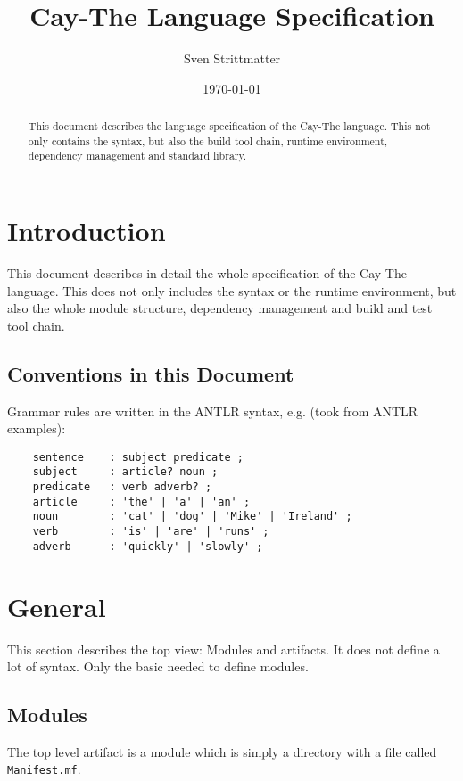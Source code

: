 \documentclass[a4paper,12pt]{report}
\title{Cay-The Language Specification}
\author{Sven Strittmatter}
\date{\today}
\begin{document}
\maketitle
\begin{abstract}
    This document describes the language specification of the Cay-The language. This not only contains the syntax, but also the build tool chain, runtime environment, dependency management and standard library.
\end{abstract}
\clearpage

\tableofcontents
\clearpage

\chapter{Introduction}

This document describes in detail the whole specification of the Cay-The language. This does not only includes the syntax or the runtime environment, but also the whole module structure, dependency management and build and test tool chain.

\section{Conventions in this Document}

Grammar rules are written in the ANTLR syntax\cite{antlr-docu}, e.g. (took from ANTLR examples\cite{antlr-grammars}):

\begin{verbatim}
    sentence    : subject predicate ;
    subject     : article? noun ;
    predicate   : verb adverb? ;
    article     : 'the' | 'a' | 'an' ;
    noun        : 'cat' | 'dog' | 'Mike' | 'Ireland' ;
    verb        : 'is' | 'are' | 'runs' ;
    adverb      : 'quickly' | 'slowly' ;
\end{verbatim}

\chapter{General}

This section describes the top view: Modules and artifacts. It does not define a lot of syntax. Only the basic needed to define modules.

\section{Modules}

The top level artifact is a module which is simply a directory with a file called \verb|Manifest.mf|.
\end{document}
